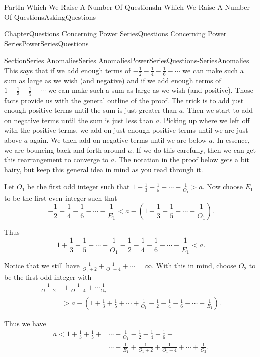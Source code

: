 \documentclass[oneside,10pt,]{book}
\numberwithin{equation}{part}
\newcommand{\lt}{<}
\newcommand{\gt}{>}
\newcommand{\amp}{&}
\begin{document}
\begin{partptx}{Part}{In Which We Raise A Number Of Questions}{}{In Which We Raise A Number Of Questions}{}{}{AskingQuestions}
\begin{chapterptx}{Chapter}{Questions Concerning Power Series}{}{Questions Concerning Power Series}{}{}{PowerSeriesQuestions}
\begin{sectionptx}{Section}{Series Anomalies}{}{Series Anomalies}{}{}{PowerSeriesQuestions-SeriesAnomalies}
This says that if we add enough terms of \(-\frac{1}{2}-\frac{1}{4}-\frac{1}{6}-\cdots\) we can make such a sum as large as we wish (and negative) and if we add enough terms of \(1+\frac{1}{3}+\frac{1}{5}+\cdots\) we can make such a sum as large as we wish (and positive).  Those facts provide us with the general outline of the proof.  The trick is to add just enough positive terms until the sum is just greater than \(a\).  Then we start to add on negative terms until the sum is just less than \(a\).  Picking up where we left off with the positive terms, we add on just enough positive terms until we are just above \(a\) again.  We then add on negative terms until we are below \(a\).  In essence, we are bouncing back and forth around \(a\).  If we do this carefully, then we can get this rearrangement to converge to \(a\).  The notation in the proof below gets a bit hairy, but keep this general idea in mind as you read through it.%
\par
Let \(O_1\) be the first odd integer such that \(1+\frac{1}{3}+\frac{1}{5}+\cdots+\frac{1}{O_1}>a\). Now choose \(E_1\) to be the first even integer such that%
\begin{equation*}
-\frac{1}{2}-\frac{1}{4}-\frac{1}{6}-\cdots-\frac{1}{E_1} \lt a-\left(1+\frac{1}{3}+\frac{1}{5}+\cdots+\frac{1}{O_1}\right)\text{.}
\end{equation*}
%
\par
Thus%
\begin{equation*}
1+\frac{1}{3}+\frac{1}{5}+\cdots+\frac{1}{O_1}-\frac{1}{2}-\frac{1}{4} - \frac{1}{6}-\cdots-\frac{1}{E_1}\lt a\text{.}
\end{equation*}
%
\par
Notice that we still have \(\frac{1}{O_1+2}+\frac{1}{O_1+4}+\cdots=\infty\). With this in mind, choose \(O_2\) to be the first odd integer with%
\begin{align*}
\frac{1}{O_1+2}\amp{}+\frac{1}{O_1+4}+\cdots\frac{1}{O_2}\\
\amp{}\gt          a-\left(1+\frac{1}{3}+
\frac{1}{5}+\cdots+\frac{1}{O_1}-\frac{1}{2}-\frac{1}{4}-\frac{1}{6}-\cdots-
\frac{1}{E_1}\right).
\end{align*}
%
\par
Thus we have%
\begin{align*}
a\lt
1+\frac{1}{3}+\frac{1}{5}+\amp{}\cdots+\frac{1}{O_1}-\frac{1}{2}-\frac{1}{4}-
\frac{1}{6}-\\
\amp{}\cdots-\frac{1}{E_1}+\frac{1}{O_1+2}+\frac{1}{O_1+4}+\cdots+
\frac{1}{O_2}.
\end{align*}

\end{sectionptx}
\end{chapterptx}
\end{partptx}
\end{document}
